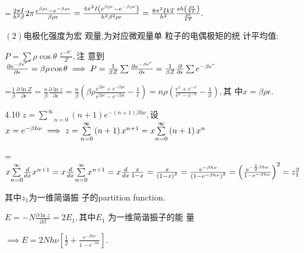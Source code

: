 \documentclass{ctexart}
\begin{document}
=$\frac{2\pi I}{h^{2}\beta }2\pi \frac{e^{\beta \rho \epsilon }-e^{-\beta
\rho \epsilon }}{\beta \rho \epsilon }=\frac{4\pi ^{2}I\left( e^{\beta \rho
\epsilon }-e^{-\beta \rho \epsilon }\right) }{h^{2}\beta ^{2}\rho \epsilon }=%
\frac{8\pi ^{2}IkT}{h^{2}}\frac{sh\left( \frac{\rho \epsilon }{kT}\right) }{%
\frac{\rho \epsilon }{kT}}.$

$\left( 2\right) $电极化强度为宏%
观量,为对应微观量单%
粒子的电偶极矩的统%
计平均值:

$P=\sum \rho \cos \theta $ $\frac{e^{-\beta \epsilon ^{r}}}{Z},$注%
意到$\frac{\partial e^{-\beta \epsilon ^{r}}}{\partial \epsilon }%
=\beta \rho \cos \theta \implies P=\frac{1}{\beta Z}\sum \frac{\partial
e^{-\beta \epsilon ^{r}}}{\partial \epsilon }=\frac{1}{\beta Z}\frac{%
\partial }{\partial \epsilon }\sum e^{-\beta \epsilon ^{r}}$

=$\frac{1}{\beta }\frac{\partial \ln Z}{\partial \epsilon }=\frac{n}{\beta }%
\frac{\partial \ln z}{\partial \epsilon }=\frac{n}{\beta }\left( \beta \rho 
\frac{e^{\beta \rho \epsilon }+e^{-\beta \rho \epsilon }}{e^{\beta \rho
\epsilon }-e^{-\beta \rho \epsilon }}-\frac{1}{\epsilon }\right) =n\rho
\left( \frac{e^{x}+e^{-x}}{e^{x}-e^{-x}}-\frac{1}{x}\right) ,$其%
中$x=\beta \rho \epsilon .$

4.10 $z=\underset{n=0}{\overset{\infty }{\sum }}\left( n+1\right) e^{-\left(
n+1\right) \beta h\nu },$设$x=e^{-\beta h\nu }\implies z=\underset{n=0}%
{\overset{\infty }{\sum }}\left( n+1\right) x^{n+1}=x\underset{n=0}{\overset{%
\infty }{\sum }}\left( n+1\right) x^{n}$

=$x\underset{n=0}{\overset{\infty }{\sum }}\frac{d}{dx}x^{n+1}=x\frac{d}{dx}%
\underset{n=0}{\overset{\infty }{\sum }}x^{n+1}=x\frac{d}{dx}\frac{x}{1-x}%
=\allowbreak \frac{x}{\left( 1-x\right) ^{2}}=\frac{e^{-\beta h\nu }}{\left(
1-e^{-\beta h\nu }\right) ^{2}}=\left( \frac{e^{-\frac{1}{2}\beta h\nu }}{%
1-e^{-\beta h\nu }}\right) ^{2}=z_{1}^{2}$

其中$z_{1}$为一维简谐振%
子的partition function.

$E=-N\frac{\partial \ln z}{\partial \beta }=2E_{1},$其中$E_{1}$%
为一维简谐振子的能%
量

$\implies E=2Nh\nu \left[ \frac{1}{2}+\frac{e^{-\beta h\nu }}{1-e^{^{-\beta
h\nu }}}\right] .$
\end{document}
